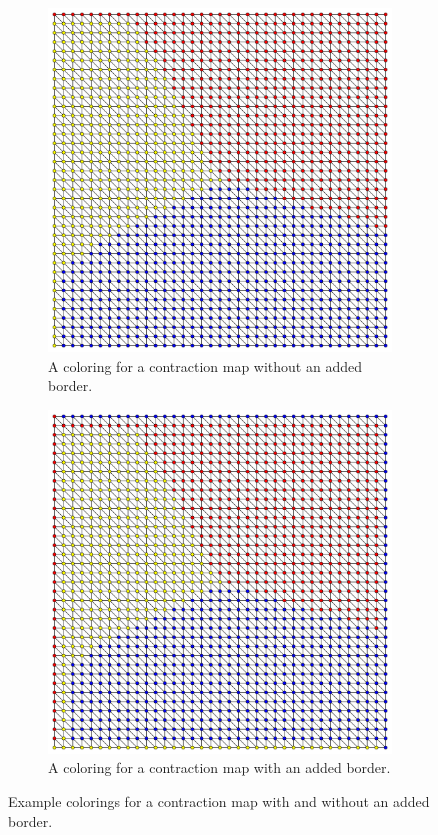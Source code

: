   \begin{figure}
    \centering
    \begin{subfigure}[h]{0.7\textwidth}
      \includegraphics[width=\textwidth]{ContractionToEOPL_example1_WithoutBorder}
      \caption{A coloring for a contraction map without an added border.}
      \label{fig:withoutBorder}
    \end{subfigure}
    \begin{subfigure}[h]{0.7\textwidth}
      \includegraphics[width=\textwidth]{ContractionToEOPL_example1_WithBorder}
      \caption{A coloring for a contraction map with an added border.}
      \label{fig:withBorder}
    \end{subfigure}    
    \caption{Example colorings for a contraction map with and without an added border.}
  \end{figure}


